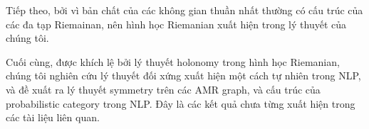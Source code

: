 Tiếp theo, bởi vì bản chất của các không gian thuần nhất thường có cấu trúc của các đa tạp Riemainan, nên hình học Riemanian xuất hiện trong lý thuyết của chúng tôi.


Cuối cùng, được khích lệ bởi lý thuyết holonomy trong hình học Riemanian, chúng tôi nghiên cứu lý thuyết đối xứng xuất hiện một cách tự nhiên trong NLP, và đề xuất ra lý thuyết  symmetry trên các AMR graph, và cấu trúc của probabilistic  category trong NLP. Đây là các kết quả chưa từng xuất hiện trong các tài liệu liên quan.  
